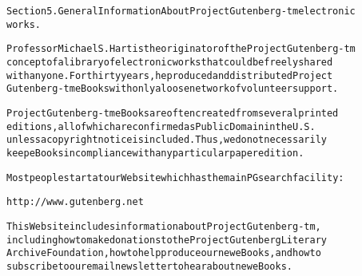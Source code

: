 \documentclass[12pt]{book}[2005/09/16]
\newenvironment{PGtext}{%
\begin{alltt}
\fontsize{8.1}{9}\ttfamily\selectfont}%
{\end{alltt}}
\begin{document}
\begin{PGtext}
Section 5.  General Information About Project Gutenberg-tm electronic
works.

Professor Michael S. Hart is the originator of the Project Gutenberg-tm
concept of a library of electronic works that could be freely shared
with anyone.  For thirty years, he produced and distributed Project
Gutenberg-tm eBooks with only a loose network of volunteer support.


Project Gutenberg-tm eBooks are often created from several printed
editions, all of which are confirmed as Public Domain in the U.S.
unless a copyright notice is included.  Thus, we do not necessarily
keep eBooks in compliance with any particular paper edition.


Most people start at our Web site which has the main PG search facility:

     http://www.gutenberg.net

This Web site includes information about Project Gutenberg-tm,
including how to make donations to the Project Gutenberg Literary
Archive Foundation, how to help produce our new eBooks, and how to
subscribe to our email newsletter to hear about new eBooks.
\end{PGtext}

\end{document}
